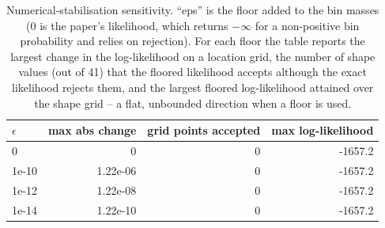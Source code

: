 \begin{table}[t]
\centering
\small
\caption{Numerical-stabilisation sensitivity. ``eps'' is the floor added to the bin masses ($0$ is the paper's likelihood, which returns $-\infty$ for a non-positive bin probability and relies on rejection). For each floor the table reports the largest change in the log-likelihood on a location grid, the number of shape values (out of 41) that the floored likelihood accepts although the exact likelihood rejects them, and the largest floored log-likelihood attained over the shape grid -- a flat, unbounded direction when a floor is used.}
\label{tab:supp-eps}
\begin{tabular}{lrrr}
\toprule
$\epsilon$ & max abs change & grid points accepted & max log-likelihood \\
\midrule
   0 &    0 & 0 & -1657.2 \\
1e-10 & 1.22e-06 & 0 & -1657.2 \\
1e-12 & 1.22e-08 & 0 & -1657.2 \\
1e-14 & 1.22e-10 & 0 & -1657.2 \\
\bottomrule
\end{tabular}
\end{table}
